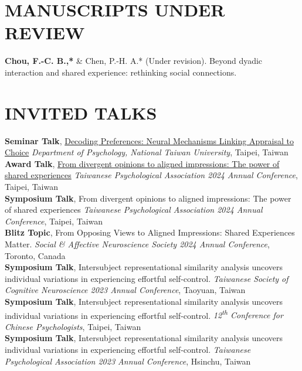 \documentclass[a4paper,12pt]{article}
\newcommand{\sectionspace}{0pt} %
\newcommand{\itemspace}{7pt} %
\begin{document}
\section*{MANUSCRIPTS UNDER REVIEW}
\noindent \textbf{Chou, F.-C. B.,*} \& Chen, P.-H. A.* (Under revision). Beyond dyadic interaction and shared experience: rethinking social connections. \\[\itemspace]

\section*{INVITED TALKS}
\textbf{Seminar Talk}, \href{http://www.psy.ntu.edu.tw/index.php/homepage/speech/2903-1131127}{Decoding Preferences: Neural Mechanisms Linking Appraisal to Choice} \textit{Department of Psychology, National Taiwan University}, Taipei, Taiwan \\[\itemspace]
\textbf{Award Talk}, \href{https://github.com/Ben-FCC/Ben-FCC_CV/blob/main/assets/2024_TPA_Oral.pdf}{From divergent opinions to aligned impressions: The power of shared experiences}  \textit{Taiwanese Psychological Association 2024 Annual Conference}, Taipei, Taiwan \\[\itemspace]
\textbf{Symposium Talk}, From divergent opinions to aligned impressions: The power of shared experiences  \textit{Taiwanese Psychological Association 2024 Annual Conference}, Taipei, Taiwan \\[\itemspace]
\textbf{Blitz Topic},  From Opposing Views to Aligned Impressions: Shared Experiences Matter.  \textit{Social \& Affective Neuroscience Society 2024 Annual Conference}, Toronto, Canada \\[\itemspace]
\textbf{Symposium Talk}, Intersubject representational similarity analysis uncovers individual variations in experiencing effortful self-control. \textit{Taiwanese Society of Cognitive Neuroscience 2023 Annual Conference}, Taoyuan, Taiwan \\[\itemspace]
\textbf{Symposium Talk}, Intersubject representational similarity analysis uncovers individual variations in experiencing effortful self-control.  \textit{12\textsuperscript{th} Conference for Chinese Psychologists}, Taipei, Taiwan \\[\itemspace]
\textbf{Symposium Talk}, Intersubject representational similarity analysis uncovers individual variations in experiencing effortful self-control.  \textit{Taiwanese Psychological Association 2023 Annual Conference}, Hsinchu, Taiwan 

\vspace{\sectionspace}
\end{document}
